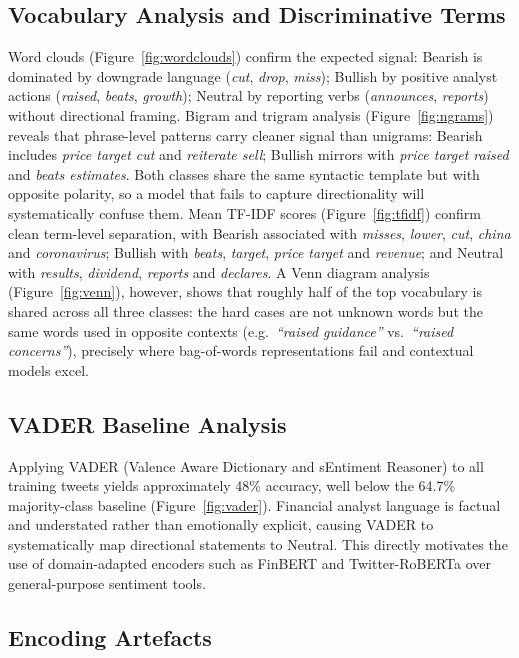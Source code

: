 \documentclass[11pt,a4paper]{article}
\begin{document}
\subsection{Vocabulary Analysis and Discriminative Terms}

Word clouds (Figure~\ref{fig:wordclouds}) confirm the expected signal: Bearish is
dominated by downgrade language (\textit{cut}, \textit{drop}, \textit{miss}); Bullish by
positive analyst actions (\textit{raised}, \textit{beats}, \textit{growth}); Neutral by
reporting verbs (\textit{announces}, \textit{reports}) without directional framing.
Bigram and trigram analysis (Figure~\ref{fig:ngrams}) reveals that phrase-level patterns
carry cleaner signal than unigrams: Bearish includes \textit{price target cut} and
\textit{reiterate sell}; Bullish mirrors with \textit{price target raised} and
\textit{beats estimates}. Both classes share the same syntactic template but with opposite
polarity, so a model that fails to capture directionality will systematically confuse
them. Mean TF-IDF scores (Figure~\ref{fig:tfidf}) confirm clean term-level separation,
with Bearish associated with \textit{misses}, \textit{lower}, \textit{cut},
\textit{china} and \textit{coronavirus}; Bullish with \textit{beats}, \textit{target},
\textit{price target} and \textit{revenue}; and Neutral with \textit{results},
\textit{dividend}, \textit{reports} and \textit{declares}. A Venn diagram analysis
(Figure~\ref{fig:venn}), however, shows that roughly half of the top vocabulary is shared
across all three classes: the hard cases are not unknown words but the same words used in
opposite contexts (e.g.\ \textit{``raised guidance''} vs.\ \textit{``raised concerns''}),
precisely where bag-of-words representations fail and contextual models excel.

\subsection{VADER Baseline Analysis}

Applying VADER (Valence Aware Dictionary and sEntiment Reasoner) to all training tweets
yields approximately 48\% accuracy, well below the 64.7\% majority-class baseline
(Figure~\ref{fig:vader}). Financial analyst language is factual and understated rather
than emotionally explicit, causing VADER to systematically map directional statements to
Neutral. This directly motivates the use of domain-adapted encoders such as FinBERT and
Twitter-RoBERTa over general-purpose sentiment tools.

\subsection{Encoding Artefacts}
\end{document}
